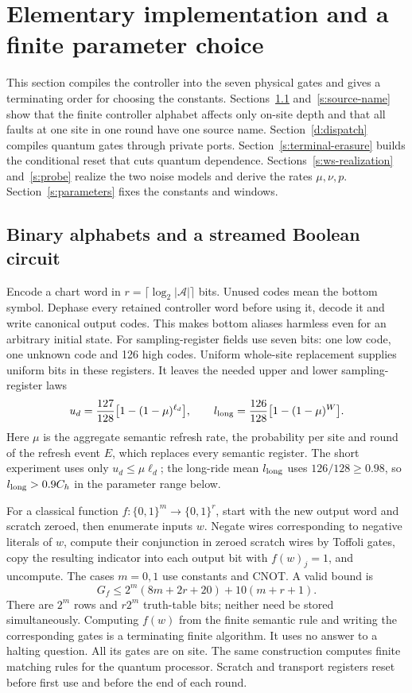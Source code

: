 \section{Elementary implementation and a finite parameter choice}\label{s:compile}\label{sec:compilation}
This section compiles the controller into the seven physical gates and gives a terminating order for choosing the constants. Sections~\ref{s:binary-alphabets} and~\ref{s:source-name} show that the finite controller alphabet affects only on-site depth and that all faults at one site in one round have one source name. Section~\ref{d:dispatch} compiles quantum gates through private ports. Section~\ref{s:terminal-erasure} builds the conditional reset that cuts quantum dependence. Sections~\ref{s:ws-realization} and~\ref{s:probe} realize the two noise models and derive the rates \(\mu,\nu,p\). Section~\ref{s:parameters} fixes the constants and windows.

\subsection{Binary alphabets and a streamed Boolean circuit}\label{s:binary-alphabets}
Encode a chart word in \(r=\lceil\log_2|\mathcal A|\rceil\) bits.
Unused codes mean the bottom symbol. Dephase every retained controller
word before using it, decode it and write canonical output codes. This
makes bottom aliases harmless even for an arbitrary initial state.
For sampling-register fields use seven bits: one low code, one unknown code and
126 high codes. Uniform whole-site replacement supplies uniform bits
in these registers. It leaves the needed upper and lower sampling-register laws
\begin{equation}\label{eq:helper-law}
 u_d=\frac{127}{128}\bigl[1-(1-\mu)^{\ell_d}\bigr],\qquad
 l_{\rm long}=\frac{126}{128}\bigl[1-(1-\mu)^W\bigr].
\end{equation}
Here \(\mu\) is the aggregate semantic refresh rate, the probability per site and round of the refresh event \(E\), which replaces every semantic register. The short experiment uses
only \(u_d\le\mu\ell_d\); the long-ride mean \(l_{\rm long}\) uses
\(126/128\ge 0.98\), so \(l_{\rm long}>0.9C_h\) in the parameter range below.

For a classical function \(f:\{0,1\}^m\to\{0,1\}^r\), start with the new output word and scratch zeroed, then enumerate
inputs \(w\). Negate wires corresponding to negative literals of \(w\),
compute their conjunction in zeroed scratch wires by Toffoli gates,
copy the resulting indicator into each output bit with \(f(w)_j=1\),
and uncompute. The cases \(m=0,1\) use constants and CNOT. A valid bound is
\[
 G_f\le2^m(8m+2r+20)+10(m+r+1).
\]
There are \(2^m\) rows and \(r2^m\) truth-table bits; neither need be
stored simultaneously. Computing \(f(w)\) from the finite semantic rule
and writing the corresponding gates is a terminating finite algorithm.
It uses no answer to a halting question. All its gates are on site.
The same construction computes finite matching rules for the quantum
processor. Scratch and transport registers reset before first use and
before the end of each round.

